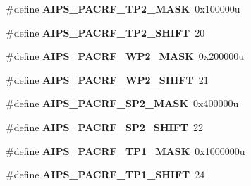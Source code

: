 \begin{DoxyCompactItemize}
\item 
\hypertarget{group___a_i_p_s___register___masks_gafaccdf2fddd8d63f8180d9e56f921a9b}{}\#define {\bfseries A\+I\+P\+S\+\_\+\+P\+A\+C\+R\+F\+\_\+\+T\+P2\+\_\+\+M\+A\+S\+K}~0x100000u\label{group___a_i_p_s___register___masks_gafaccdf2fddd8d63f8180d9e56f921a9b}

\item 
\hypertarget{group___a_i_p_s___register___masks_ga983b0e1aaae08c8b403e1f005301da2d}{}\#define {\bfseries A\+I\+P\+S\+\_\+\+P\+A\+C\+R\+F\+\_\+\+T\+P2\+\_\+\+S\+H\+I\+F\+T}~20\label{group___a_i_p_s___register___masks_ga983b0e1aaae08c8b403e1f005301da2d}

\item 
\hypertarget{group___a_i_p_s___register___masks_ga3d3a86b85f34c9744b470e2cd2ff6b00}{}\#define {\bfseries A\+I\+P\+S\+\_\+\+P\+A\+C\+R\+F\+\_\+\+W\+P2\+\_\+\+M\+A\+S\+K}~0x200000u\label{group___a_i_p_s___register___masks_ga3d3a86b85f34c9744b470e2cd2ff6b00}

\item 
\hypertarget{group___a_i_p_s___register___masks_gad0d4a8aa4280ac15edde751626588663}{}\#define {\bfseries A\+I\+P\+S\+\_\+\+P\+A\+C\+R\+F\+\_\+\+W\+P2\+\_\+\+S\+H\+I\+F\+T}~21\label{group___a_i_p_s___register___masks_gad0d4a8aa4280ac15edde751626588663}

\item 
\hypertarget{group___a_i_p_s___register___masks_gaf3f8e1a91ecb9d68f8738c8a5dc0dcbe}{}\#define {\bfseries A\+I\+P\+S\+\_\+\+P\+A\+C\+R\+F\+\_\+\+S\+P2\+\_\+\+M\+A\+S\+K}~0x400000u\label{group___a_i_p_s___register___masks_gaf3f8e1a91ecb9d68f8738c8a5dc0dcbe}

\item 
\hypertarget{group___a_i_p_s___register___masks_gad42b1d7f0c64c25514f04f84507e1a0e}{}\#define {\bfseries A\+I\+P\+S\+\_\+\+P\+A\+C\+R\+F\+\_\+\+S\+P2\+\_\+\+S\+H\+I\+F\+T}~22\label{group___a_i_p_s___register___masks_gad42b1d7f0c64c25514f04f84507e1a0e}

\item 
\hypertarget{group___a_i_p_s___register___masks_ga47e7b3e22494a83ba6942d54ed7d1835}{}\#define {\bfseries A\+I\+P\+S\+\_\+\+P\+A\+C\+R\+F\+\_\+\+T\+P1\+\_\+\+M\+A\+S\+K}~0x1000000u\label{group___a_i_p_s___register___masks_ga47e7b3e22494a83ba6942d54ed7d1835}

\item 
\hypertarget{group___a_i_p_s___register___masks_gadad146252c4d20d73f2603366b5ebd58}{}\#define {\bfseries A\+I\+P\+S\+\_\+\+P\+A\+C\+R\+F\+\_\+\+T\+P1\+\_\+\+S\+H\+I\+F\+T}~24\label{group___a_i_p_s___register___masks_gadad146252c4d20d73f2603366b5ebd58}


\end{DoxyCompactItemize}

